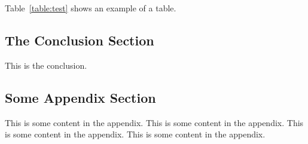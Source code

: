 \documentclass[a4paper]{article}
\begin{document}
Table~\ref{table:test} shows an example of a table.

\subsection{The Conclusion Section}

This is the conclusion.




\appendix 
\subsection{Some Appendix Section}

This is some content in the appendix.
This is some content in the appendix.
This is some content in the appendix.
This is some content in the appendix.
\end{document}
